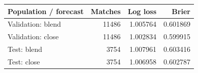 \begin{tabular}{lrrr}
\toprule
Population / forecast & Matches & Log loss & Brier \\
\midrule
Validation: blend & 11486 & 1.005764 & 0.601869 \\
Validation: close & 11486 & 1.002834 & 0.599915 \\
Test: blend & 3754 & 1.007961 & 0.603416 \\
Test: close & 3754 & 1.006958 & 0.602787 \\
\bottomrule
\end{tabular}

